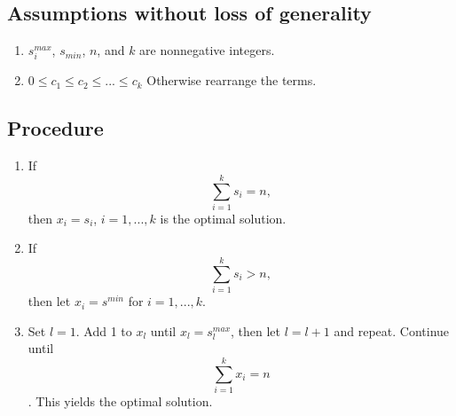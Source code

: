 \documentclass[../mthe-493-final-project.tex]{subfiles}
\begin{document}
    \subsection*{Assumptions without loss of generality}
    \begin{enumerate}
        \item $s_i^{max}$, $s_{min}$, $n$, and $k$ are nonnegative integers.
        \item $0 \leq c_1 \leq c_2 \leq ... \leq c_k$ Otherwise rearrange the terms.
    \end{enumerate}
    
    \subsection*{Procedure}
    \begin{enumerate}
        \item If \[ \sum_{i=1}^k s_i = n, \] then $x_i = s_i$, $i = 1,...,k$ is the optimal solution.
        \item If \[\sum_{i=1}^k s_i > n,\] then let $x_i = s^{min}$ for $i = 1,...,k$.
        \item Set $l = 1$. Add 1 to $x_l$ until $x_l = s_l^{max}$, then let $l = l+1$ and repeat. Continue until \[ \sum_{i=1}^{k} x_i = n \]. This yields the optimal solution.
        
    \end{enumerate}
\end{document}
